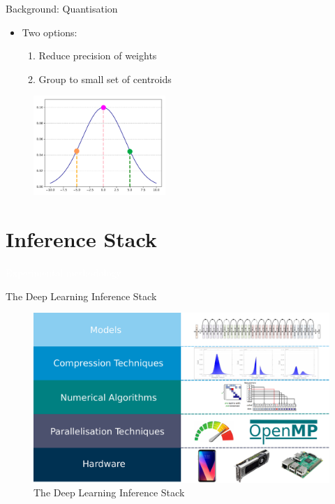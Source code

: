 \documentclass[xcolor=dvipsnames]{beamer}
\begin{document}
\begin{frame}{Background: Quantisation}
\begin{itemize}
    \item Two options:
    \begin{enumerate}
        \item Reduce precision of weights
        \item Group to small set of centroids
    \end{enumerate}
\end{itemize}

\begin{figure}
    \centering
    \includegraphics[width=5cm]{images/quantization.pdf}
\end{figure}


\end{frame}


\section{Inference Stack}

{
\begin{frame}
    \centering
    \textcolor{white}{\LARGE Experimental methodology}
\end{frame}
}

\begin{frame}{The Deep Learning Inference Stack}
\begin{figure}
    \centering
    \includegraphics[width=\linewidth]{images/inference-stack.pdf}
    \caption{The Deep Learning Inference Stack}
    \label{fig:inference-stack}
\end{figure}
\end{frame}
\end{document}
